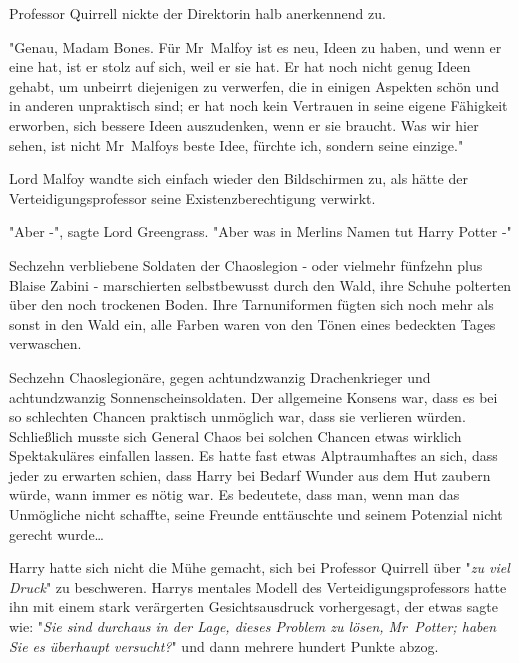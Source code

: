{Professor Quirrell nickte der Direktorin halb anerkennend zu.

"Genau, Madam Bones. Für Mr~Malfoy ist es neu, Ideen zu haben, und wenn er eine hat, ist er stolz auf sich, weil er sie hat. Er hat noch nicht genug Ideen gehabt, um unbeirrt diejenigen zu verwerfen, die in einigen Aspekten schön und in anderen unpraktisch sind; er hat noch kein Vertrauen in seine eigene Fähigkeit erworben, sich bessere Ideen auszudenken, wenn er sie braucht. Was wir hier sehen, ist nicht Mr~Malfoys beste Idee, fürchte ich, sondern seine einzige."

Lord Malfoy wandte sich einfach wieder den Bildschirmen zu, als hätte der Verteidigungsprofessor seine Existenzberechtigung verwirkt.

"Aber -", sagte Lord Greengrass. "Aber was in Merlins Namen tut Harry Potter -"

Sechzehn verbliebene Soldaten der Chaoslegion - oder vielmehr fünfzehn plus Blaise Zabini - marschierten selbstbewusst durch den Wald, ihre Schuhe polterten über den noch trockenen Boden. Ihre Tarnuniformen fügten sich noch mehr als sonst in den Wald ein, alle Farben waren von den Tönen eines bedeckten Tages verwaschen.

Sechzehn Chaoslegionäre, gegen achtundzwanzig Drachenkrieger und achtundzwanzig Sonnenscheinsoldaten. Der allgemeine Konsens war, dass es bei so schlechten Chancen praktisch unmöglich war, dass sie verlieren würden. Schließlich musste sich General Chaos bei solchen Chancen etwas wirklich Spektakuläres einfallen lassen. Es hatte fast etwas Alptraumhaftes an sich, dass jeder zu erwarten schien, dass Harry bei Bedarf Wunder aus dem Hut zaubern würde, wann immer es nötig war. Es bedeutete, dass man, wenn man das Unmögliche nicht schaffte, seine Freunde enttäuschte und seinem Potenzial nicht gerecht wurde…

Harry hatte sich nicht die Mühe gemacht, sich bei Professor Quirrell über "\emph{zu viel Druck}" zu beschweren. Harrys mentales Modell des Verteidigungsprofessors hatte ihn mit einem stark verärgerten Gesichtsausdruck vorhergesagt, der etwas sagte wie: "\emph{Sie sind durchaus in der Lage, dieses Problem zu lösen, Mr~Potter; haben Sie es überhaupt versucht?}" und dann mehrere hundert Punkte abzog.

}
